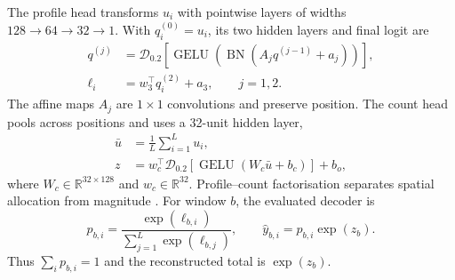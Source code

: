 The profile head transforms $u_i$ with pointwise layers of widths $128\rightarrow64\rightarrow32\rightarrow1$. With $q_i^{(0)}=u_i$, its two hidden layers and final logit are
\begin{equation}
\begin{aligned}
q^{(j)}&=\mathcal D_{0.2}\!\left[
\operatorname{GELU}\!\left(\operatorname{BN}(A_jq^{(j-1)}+a_j)\right)\right],\\
\ell_i&=w_3^\top q_i^{(2)}+a_3,\qquad j=1,2.
\end{aligned}
\label{eq:profile_head}
\end{equation}
The affine maps $A_j$ are $1\times1$ convolutions and preserve position. The count head pools across positions and uses a 32-unit hidden layer,
\begin{equation}
\begin{aligned}
\bar u&=\frac1L\sum_{i=1}^{L}u_i,\\
z&=w_c^\top\mathcal D_{0.2}\!\left[
\operatorname{GELU}(W_c\bar u+b_c)\right]+b_o,
\end{aligned}
\label{eq:count_head}
\end{equation}
where $W_c\in\mathbb R^{32\times128}$ and $w_c\in\mathbb R^{32}$. Profile--count factorisation separates spatial allocation from magnitude \citep{avsec2021bpnet}. For window $b$, the evaluated decoder is
\begin{equation}
p_{b,i}=\frac{\exp(\ell_{b,i})}{\sum_{j=1}^{L}\exp(\ell_{b,j})},
\qquad \hat y_{b,i}=p_{b,i}\exp(z_b).
\label{eq:dual_head_decode}
\end{equation}
Thus $\sum_i p_{b,i}=1$ and the reconstructed total is $\exp(z_b)$.

